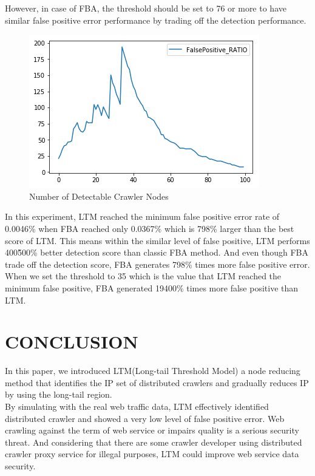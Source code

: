 \documentclass[sigconf,anonymous=true]{acmart}
\begin{document}
\begin{enumerate}
 However, in case of FBA, the threshold should be set to 76 or more to have similar false positive error performance by trading off the detection performance.\\

\begin{figure}[H]
    \centering
    \includegraphics[width=0.85\columnwidth]{figs/figure_fp_ratio.png}
    \caption{Number of Detectable Crawler Nodes}
    \label{fig:my_label}
\end{figure}

In this experiment, LTM reached the minimum false positive error rate of 0.0046\% when FBA reached only 0.0367\% which is 798\% larger than the best score of LTM. This means within the similar level of false positive, LTM performs 400\~500\% better detection score than classic FBA method. And even though FBA trade off the detection score, FBA generates 798\% times more false positive error. When we set the threshold to 35 which is the value that LTM reached the minimum false positive, FBA generated 19400\% times more false positive than LTM.

\end{enumerate}



%
%
\section{CONCLUSION}
In this paper, we introduced LTM(Long-tail Threshold Model) a node reducing method that identifies the IP set of distributed crawlers and gradually reduces IP by using the long-tail region.\\
By simulating with the real web traffic data, LTM effectively identified distributed crawler and showed a very low level of false positive error.
Web crawling against the term of web service or impairs quality is a serious security threat. And considering that there are some crawler developer using distributed crawler proxy service for illegal purposes, LTM could improve web service data security.
\end{document}
